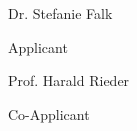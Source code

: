 \begin{minipage}{.4\textwidth}
  \hrulefill
  
  \hspace*{0mm}\phantom{}Dr. Stefanie Falk
  
  \hspace*{0mm}\phantom{}Applicant
\end{minipage}%
\hfill
\begin{minipage}{.4\textwidth}
  \hrulefill
  
  \hspace*{0mm}\phantom{}Prof. Harald Rieder
  
  \hspace*{0mm}\phantom{}Co-Applicant
\end{minipage}


